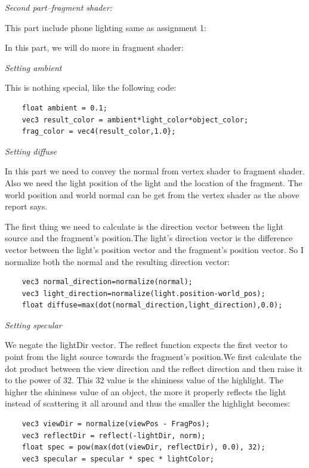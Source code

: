 \documentclass[acmtog]{acmart}
\begin{document}
\textcolor[rgb]{1,0,0}{\textit{Second part--fragment shader:}}

This part include phone lighting same as assignment 1:

In this part, we will do more in fragment shader:

\textcolor[rgb]{1,0,0}{\textit{Setting ambient}}

This is nothing special, like the following code:

\begin{lstlisting}
	float ambient = 0.1;
	vec3 result_color = ambient*light_color*object_color;
	frag_color = vec4(result_color,1.0};
\end{lstlisting}

\textcolor[rgb]{1,0,0}{\textit{Setting diffuse}}

In this part we need to convey the normal from vertex shader to fragment shader. Also we need the light position of the light and the location of the fragment. The world position and world normal can be get from the vertex shader as the above report says.

The first thing we need to calculate is the direction vector between the light source and the fragment's position.The light's direction vector is the difference vector between the light's position vector and the fragment's position vector. So I normalize both the normal and the resulting direction vector:

\begin{lstlisting}
	vec3 normal_direction=normalize(normal);
    vec3 light_direction=normalize(light.position-world_pos); 
    float diffuse=max(dot(normal_direction,light_direction),0.0);
\end{lstlisting}

\textcolor[rgb]{1,0,0}{\textit{Setting specular}}

We negate the lightDir vector. The reflect function expects the first vector to point from the light source towards the fragment's position.We first calculate the dot product between the view direction and the reflect direction and then raise it to the power of 32. This 32 value is the shininess value of the highlight. The higher the shininess value of an object, the more it properly reflects the light instead of scattering it all around and thus the smaller the highlight becomes:

\begin{lstlisting}
	vec3 viewDir = normalize(viewPos - FragPos);
    vec3 reflectDir = reflect(-lightDir, norm);
    float spec = pow(max(dot(viewDir, reflectDir), 0.0), 32);
    vec3 specular = specular * spec * lightColor; 
\end{lstlisting}
\end{document}
